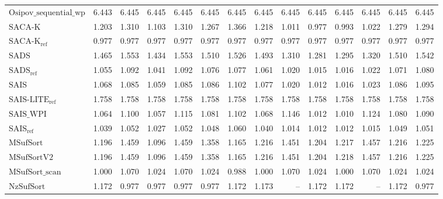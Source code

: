 \begin{table}
{\begin{tabular}{lrrrrrrrrrrrrr}
    $\text{Osipov\_sequential\_wp}$ & {\color{red}6.443} & {\color{red}6.445} & {\color{red}6.445} & {\color{red}6.445} & {\color{red}6.445} & {\color{red}6.445} & {\color{red}6.445} & {\color{red}6.445} & {\color{red}6.445} & {\color{red}6.445} & {\color{red}6.445} & {\color{red}6.445} & {\color{red}6.445} \\
    $\text{SACA-K}$ & 1.203 & 1.310 & 1.103 & 1.310 & 1.267 & 1.366 & 1.218 & 1.011 & 0.977 & 0.993 & 1.022 & 1.279 & 1.294 \\
    $\text{SACA-K}_{\text{ref}}$ & {\color{green!60!black}0.977} & {\color{green!60!black}0.977} & {\color{green!60!black}0.977} & {\color{green!60!black}0.977} & {\color{green!60!black}0.977} & {\color{green!60!black}0.977} & {\color{green!60!black}0.977} & {\color{green!60!black}0.977} & {\color{green!60!black}0.977} & {\color{green!60!black}0.977} & {\color{green!60!black}0.977} & {\color{green!60!black}0.977} & {\color{green!60!black}0.977} \\
    $\text{SADS}$ & 1.465 & 1.553 & 1.434 & 1.553 & 1.510 & 1.526 & 1.493 & 1.310 & 1.281 & 1.295 & 1.320 & 1.510 & 1.542 \\
    $\text{SADS}_{\text{ref}}$ & 1.055 & 1.092 & 1.041 & 1.092 & 1.076 & 1.077 & 1.061 & 1.020 & 1.015 & 1.016 & 1.022 & 1.071 & 1.080 \\
    $\text{SAIS}$ & 1.068 & 1.085 & 1.059 & 1.085 & 1.086 & 1.102 & 1.077 & 1.020 & 1.012 & 1.016 & 1.023 & 1.086 & 1.095 \\
    $\text{SAIS-LITE}_{\text{ref}}$ & 1.758 & 1.758 & 1.758 & 1.758 & 1.758 & 1.758 & 1.758 & 1.758 & 1.758 & 1.758 & 1.758 & 1.758 & 1.758 \\
    $\text{SAIS\_WPI}$ & 1.064 & 1.100 & 1.057 & 1.115 & 1.081 & 1.102 & 1.068 & 1.146 & 1.012 & 1.010 & 1.124 & 1.080 & 1.090 \\
    $\text{SAIS}_{\text{ref}}$ & 1.039 & 1.052 & 1.027 & 1.052 & 1.048 & 1.060 & 1.040 & 1.014 & 1.012 & 1.012 & 1.015 & 1.049 & 1.051 \\
    $\text{MSufSort}$ & 1.196 & 1.459 & 1.096 & 1.459 & 1.358 & 1.165 & 1.216 & 1.451 & 1.204 & 1.217 & 1.457 & 1.216 & 1.225 \\
    $\text{MSufSortV2}$ & 1.196 & 1.459 & 1.096 & 1.459 & 1.358 & 1.165 & 1.216 & 1.451 & 1.204 & 1.218 & 1.457 & 1.216 & 1.225 \\
    $\text{MSufSort\_scan}$ & 1.000 & 1.070 & 1.024 & 1.070 & 1.024 & 0.988 & 1.000 & 1.070 & 1.024 & 1.000 & 1.070 & 1.024 & 1.024 \\
    $\text{NzSufSort}$ & 1.172 & {\color{green!60!black}0.977} & {\color{green!60!black}0.977} & {\color{green!60!black}0.977} & 0.977 & 1.172 & 1.173 & {\color{darkgray}--} & 1.172 & 1.172 & {\color{darkgray}--} & 1.172 & 0.977 \\

\end{tabular}}
\end{table}
